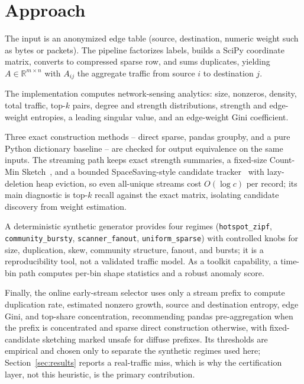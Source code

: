 \documentclass[conference]{IEEEtran}
\begin{document}
\section{Approach}
The input is an anonymized edge table (source, destination, numeric weight such as bytes or packets). The pipeline factorizes labels, builds a SciPy coordinate matrix, converts to compressed sparse row, and sums duplicates, yielding $A \in \mathbb{R}^{m \times n}$ with $A_{ij}$ the aggregate traffic from source $i$ to destination $j$.

The implementation computes network-sensing analytics: size, nonzeros, density, total traffic, top-$k$ pairs, degree and strength distributions, strength and edge-weight entropies, a leading singular value, and an edge-weight Gini coefficient.

Three exact construction methods -- direct sparse, pandas groupby, and a pure Python dictionary baseline -- are checked for output equivalence on the same inputs. The streaming path keeps exact strength summaries, a fixed-size Count-Min Sketch~\cite{cormode2005countmin}, and a bounded SpaceSaving-style candidate tracker~\cite{misra1982finding} with lazy-deletion heap eviction, so even all-unique streams cost $O(\log c)$ per record; its main diagnostic is top-$k$ recall against the exact matrix, isolating candidate discovery from weight estimation.

A deterministic synthetic generator provides four regimes (\texttt{hotspot\_zipf}, \texttt{community\_bursty}, \texttt{scanner\_fanout}, \texttt{uniform\_sparse}) with controlled knobs for size, duplication, skew, community structure, fanout, and bursts; it is a reproducibility tool, not a validated traffic model. As a toolkit capability, a time-bin path computes per-bin shape statistics and a robust anomaly score.

Finally, the online early-stream selector uses only a stream prefix to compute duplication rate, estimated nonzero growth, source and destination entropy, edge Gini, and top-share concentration, recommending pandas pre-aggregation when the prefix is concentrated and sparse direct construction otherwise, with fixed-candidate sketching marked unsafe for diffuse prefixes. Its thresholds are empirical and chosen only to separate the synthetic regimes used here; Section~\ref{sec:results} reports a real-traffic miss, which is why the certification layer, not this heuristic, is the primary contribution.
\end{document}
